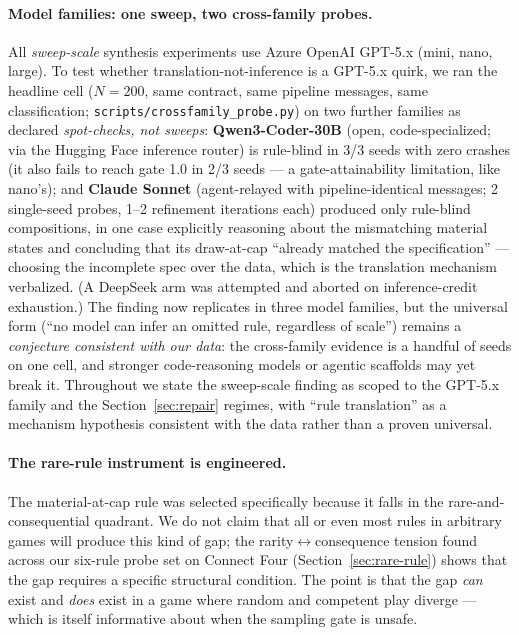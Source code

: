 \documentclass[11pt]{article}
\theoremstyle{remark}
\begin{document}
\paragraph{Model families: one sweep, two cross-family probes.} All \emph{sweep-scale} synthesis experiments use Azure OpenAI GPT-5.x (mini, nano, large). To test whether translation-not-inference is a GPT-5.x quirk, we ran the headline cell ($N=200$, same contract, same pipeline messages, same classification; \texttt{scripts/crossfamily\_probe.py}) on two further families as declared \emph{spot-checks, not sweeps}: \textbf{Qwen3-Coder-30B} (open, code-specialized; via the Hugging Face inference router) is rule-blind in 3/3 seeds with zero crashes (it also fails to reach gate 1.0 in 2/3 seeds --- a gate-attainability limitation, like nano's); and \textbf{Claude Sonnet} (agent-relayed with pipeline-identical messages; 2 single-seed probes, 1--2 refinement iterations each) produced only rule-blind compositions, in one case explicitly reasoning about the mismatching material states and concluding that its draw-at-cap ``already matched the specification'' --- choosing the incomplete spec over the data, which is the translation mechanism verbalized. (A DeepSeek arm was attempted and aborted on inference-credit exhaustion.) The finding now replicates in three model families, but the universal form (``no model can infer an omitted rule, regardless of scale'') remains a \emph{conjecture consistent with our data}: the cross-family evidence is a handful of seeds on one cell, and stronger code-reasoning models or agentic scaffolds may yet break it. Throughout we state the sweep-scale finding as scoped to the GPT-5.x family and the Section~\ref{sec:repair} regimes, with ``rule translation'' as a mechanism hypothesis consistent with the data rather than a proven universal.

\paragraph{The rare-rule instrument is engineered.} The material-at-cap rule was selected specifically because it falls in the rare-and-consequential quadrant. We do not claim that all or even most rules in arbitrary games will produce this kind of gap; the rarity$\leftrightarrow$consequence tension found across our six-rule probe set on Connect Four (Section~\ref{sec:rare-rule}) shows that the gap requires a specific structural condition. The point is that the gap \emph{can} exist and \emph{does} exist in a game where random and competent play diverge --- which is itself informative about when the sampling gate is unsafe.
\end{document}
